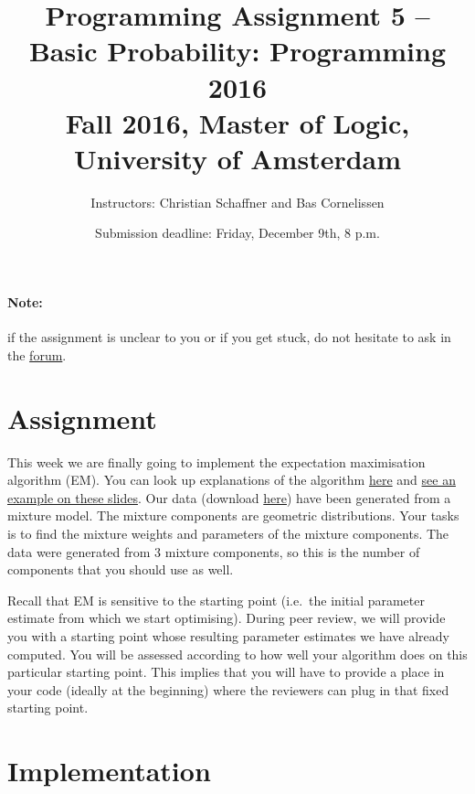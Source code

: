 \documentclass[11pt, leqno, a4paper]{article}
\title{Programming Assignment 5 -- Basic Probability: Programming 2016 \\[2mm]
\large{Fall 2016, Master of Logic, University of Amsterdam}}
\author{Instructors: Christian Schaffner and Bas Cornelissen}
\date{Submission deadline: Friday, December 9th, 8 p.m.}
\begin{document}
\maketitle

\paragraph{Note:} if the assignment is unclear to you or if you get
stuck, do not hesitate to ask in the
\href{https://www.moodle.ch/lms/mod/forum/view.php?id=1721}{forum}.

\section{Assignment}

This week we are finally going to implement the expectation maximisation algorithm (EM). You can look up explanations of the algorithm 
\href{https://github.com/BasicProbability/LectureNotes/blob/master/chapter6/chapter6.pdf}{here} and \href{https://www.moodle.ch/lms/mod/resource/view.php?id=1845}{see an example on these slides}. Our data (download \href{https://github.com/BasicProbability/BasicProbability.github.io/raw/master/Homework/Programming/2016-17/Assignment5/geometric_data.txt}{here}) have been generated from a mixture model. The mixture components are geometric distributions. Your tasks is to find
the mixture weights and parameters of the mixture components. The data were generated from 3 mixture components, so this is the number of components
that you should use as well.

Recall that EM is sensitive to the starting point (i.e.\ the initial parameter estimate from which we start optimising). During peer review, we will
provide you with a starting point whose resulting parameter estimates we have already computed. You will be assessed according to how well your
algorithm does on this particular starting point. This implies that you will have to provide a place in your code (ideally at the beginning) where
the reviewers can plug in that fixed starting point.

\section{Implementation}

\end{document}
